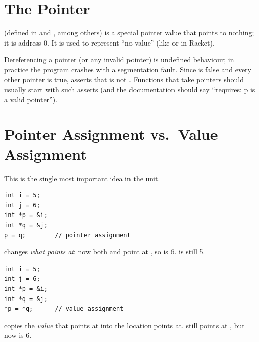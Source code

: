 \section{The  Pointer}

 (defined in  and , among others) is a special
pointer value that points to nothing; it is address 0. It is used to represent ``no value''
(like  or  in Racket).

\begin{important}
Dereferencing a  pointer (or any invalid pointer) is undefined behaviour; in practice
the program crashes with a segmentation fault. Since  is false and every other
pointer is true,  asserts that  is not . Functions that take
pointers should usually start with such asserts (and the documentation should say
``requires: p is a valid pointer'').
\end{important}

\section{Pointer Assignment vs.\ Value Assignment}

This is the single most important idea in the unit.
\begin{lstlisting}[style=c]
int i = 5;
int j = 6;
int *p = &i;
int *q = &j;
p = q;        // pointer assignment
\end{lstlisting}
 changes \emph{what  points at}: now both  and  point at
, so  is 6.  is still 5.
\begin{center}
\end{center}

\begin{lstlisting}[style=c]
int i = 5;
int j = 6;
int *p = &i;
int *q = &j;
*p = *q;      // value assignment
\end{lstlisting}
 copies the \emph{value} that  points at into the location  points
at.  still points at , but now  is 6.

